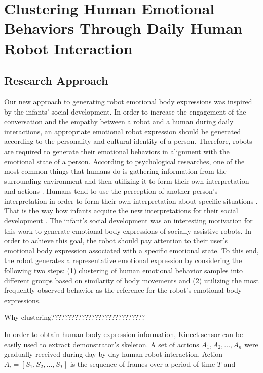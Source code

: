 \chapter{Clustering Human Emotional Behaviors Through Daily Human Robot Interaction}
\label{chap:clustering}

\section{Research Approach}
\label{sec:Research Approach}
Our new approach to generating robot emotional body expressions was inspired by the infants' social development. In order to increase the engagement of the conversation and the empathy between a robot and a human during daily interactions, an appropriate emotional robot expression should be generated according to the personality and cultural identity of a person. Therefore, robots are required to generate their emotional behaviors in alignment with the emotional state of a person. According to psychological researches, one of the most common things that humans do is gathering information from the surrounding environment and then utilizing it to form their own interpretation and actions \cite{feinman1992critical}. Humans tend to use the perception of another person's interpretation in order to form their own interpretation about specific situations \cite{feinman1982social}. That is the way how infants acquire the new interpretations for their social development \cite{feinman1982social}. The infant's social development was an interesting motivation for this work to generate emotional body expressions of socially assistive robots. In order to achieve this goal, the robot should pay attention to their user's emotional body expression associated with a specific emotional state. To this end, the robot generates a representative emotional expression by considering the following two steps: (1) clustering of human emotional behavior samples into different groups based on similarity of body movements and (2) utilizing the most frequently observed behavior as the reference for the robot's emotional body expressions. 

Why clustering????????????????????????????

In order to obtain human body expression information, Kinect sensor can be easily used to extract demonstrator's skeleton. A set of actions $A_1,A_2,...,A_n$ were gradually received during day by day human-robot interaction. Action $A_i= [S_1,S_2,...,S_T] $ is the sequence of frames over a period of time $T$ and 




